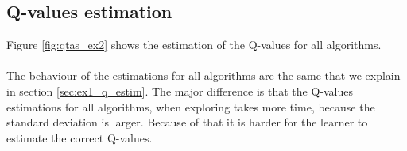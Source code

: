 \documentclass[letterpaper]{article}
\begin{document}
\subsection{Q-values estimation}


Figure \ref{fig:qtas_ex2}
shows the estimation of the Q-values for all algorithms.

\paragraph{}

The behaviour of the estimations for all algorithms are the same
that we explain in section \ref{sec:ex1_q_estim}. The major difference
is that the Q-values estimations for all algorithms, when exploring
takes more time, because the standard deviation is larger. Because of
that it is harder for the learner to estimate the correct Q-values.
\end{document}
